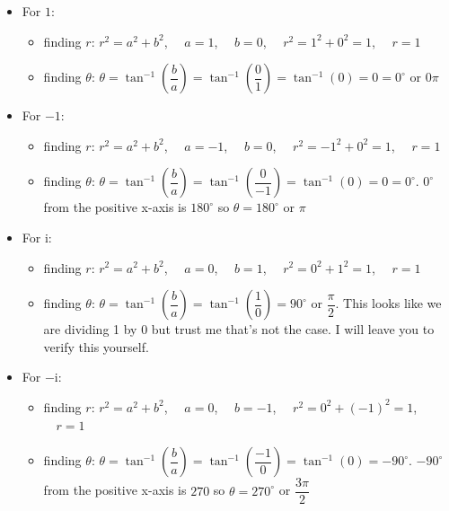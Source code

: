 \documentclass[11pt]{article}
\providecommand{\tightlist}{%
      \setlength{\itemsep}{0pt}\setlength{\parskip}{0pt}}
\begin{document}
\begin{itemize}
\tightlist
\item
  For \(1\):

  \begin{itemize}
  \tightlist
  \item
    finding \(r\): \(r^2 = a^2 + b^2\), \(\quad a = 1\),
    \(\quad b = 0\), \(\quad r^2 = 1^2 + 0^2 = 1\), \(\quad r = 1\)
  \item
    finding \(\theta\):
    \(\theta = \tan^{-1}(\dfrac{b}{a}) = \tan^{-1}(\dfrac{0}{1}) = \tan^{-1}(0) = 0 = 0^\circ\)
    or \(0\pi\)
  \end{itemize}
\item
  For \(-1\):

  \begin{itemize}
  \tightlist
  \item
    finding \(r\): \(r^2 = a^2 + b^2\), \(\quad a = -1\),
    \(\quad b = 0\), \(\quad r^2 = -1^2 + 0^2 = 1\), \(\quad r = 1\)
  \item
    finding \(\theta\):
    \(\theta = \tan^{-1}(\dfrac{b}{a}) = \tan^{-1}(\dfrac{0}{-1}) = \tan^{-1}(0) = 0 = 0^\circ\).
    \(0^\circ\) from the positive x-axis is \(180^\circ\) so
    \(\theta = 180^\circ\) or \(\pi\)
  \end{itemize}
\item
  For \(\mathrm{i}\):

  \begin{itemize}
  \tightlist
  \item
    finding \(r\): \(r^2 = a^2 + b^2\), \(\quad a = 0\),
    \(\quad b = 1\), \(\quad r^2 = 0^2 + 1^2 = 1\), \(\quad r = 1\)
  \item
    finding \(\theta\):
    \(\theta = \tan^{-1}(\dfrac{b}{a}) = \tan^{-1}(\dfrac{1}{0}) = 90^\circ\)
    or \(\dfrac{\pi}{2}\). This looks like we are dividing 1 by 0 but
    trust me that's not the case. I will leave you to verify this
    yourself.
  \end{itemize}
\item
  For \(-\mathrm{i}\):

  \begin{itemize}
  \tightlist
  \item
    finding \(r\): \(r^2 = a^2 + b^2\), \(\quad a = 0\),
    \(\quad b = -1\), \(\quad r^2 = 0^2 + (-1)^2 = 1\), \(\quad r = 1\)
  \item
    finding \(\theta\):
    \(\theta = \tan^{-1}(\dfrac{b}{a}) = \tan^{-1}(\dfrac{-1}{0}) = \tan^{-1}(0) = -90^\circ\).
    \(-90^\circ\) from the positive x-axis is \(270\) so
    \(\theta = 270^\circ\) or \(\dfrac{3\pi}{2}\)
  \end{itemize}
\end{itemize}
\end{document}
